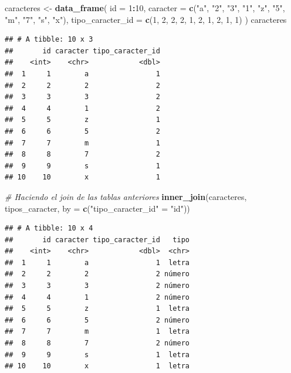 \documentclass[]{book}
\newenvironment{Shaded}{\begin{snugshade}}{\end{snugshade}}
\newcommand{\KeywordTok}[1]{\textcolor[rgb]{0.13,0.29,0.53}{\textbf{#1}}}
\newcommand{\DataTypeTok}[1]{\textcolor[rgb]{0.13,0.29,0.53}{#1}}
\newcommand{\DecValTok}[1]{\textcolor[rgb]{0.00,0.00,0.81}{#1}}
\newcommand{\StringTok}[1]{\textcolor[rgb]{0.31,0.60,0.02}{#1}}
\newcommand{\CommentTok}[1]{\textcolor[rgb]{0.56,0.35,0.01}{\textit{#1}}}
\newcommand{\OperatorTok}[1]{\textcolor[rgb]{0.81,0.36,0.00}{\textbf{#1}}}
\newcommand{\NormalTok}[1]{#1}
\theoremstyle{definition}
\theoremstyle{definition}
\theoremstyle{definition}
\theoremstyle{remark}
\begin{document}
\begin{Shaded}
\begin{Highlighting}[]
\NormalTok{caracteres <-}\StringTok{ }\KeywordTok{data_frame}\NormalTok{(}
  \DataTypeTok{id =} \DecValTok{1}\OperatorTok{:}\DecValTok{10}\NormalTok{,}
  \DataTypeTok{caracter =} \KeywordTok{c}\NormalTok{(}\StringTok{"a"}\NormalTok{, }\StringTok{"2"}\NormalTok{, }\StringTok{"3"}\NormalTok{, }\StringTok{"1"}\NormalTok{, }\StringTok{"z"}\NormalTok{, }\StringTok{"5"}\NormalTok{, }\StringTok{"m"}\NormalTok{, }\StringTok{"7"}\NormalTok{, }\StringTok{"s"}\NormalTok{, }\StringTok{"x"}\NormalTok{),}
  \DataTypeTok{tipo_caracter_id =} \KeywordTok{c}\NormalTok{(}\DecValTok{1}\NormalTok{, }\DecValTok{2}\NormalTok{, }\DecValTok{2}\NormalTok{, }\DecValTok{2}\NormalTok{, }\DecValTok{1}\NormalTok{, }\DecValTok{2}\NormalTok{, }\DecValTok{1}\NormalTok{, }\DecValTok{2}\NormalTok{, }\DecValTok{1}\NormalTok{, }\DecValTok{1}\NormalTok{)}
\NormalTok{)}
\NormalTok{caracteres}
\end{Highlighting}
\end{Shaded}

\begin{verbatim}
## # A tibble: 10 x 3
##       id caracter tipo_caracter_id
##    <int>    <chr>            <dbl>
##  1     1        a                1
##  2     2        2                2
##  3     3        3                2
##  4     4        1                2
##  5     5        z                1
##  6     6        5                2
##  7     7        m                1
##  8     8        7                2
##  9     9        s                1
## 10    10        x                1
\end{verbatim}

\begin{Shaded}
\begin{Highlighting}[]
\CommentTok{# Haciendo el join de las tablas anteriores}
\KeywordTok{inner_join}\NormalTok{(caracteres, tipos_caracter, }\DataTypeTok{by =} \KeywordTok{c}\NormalTok{(}\StringTok{"tipo_caracter_id"}\NormalTok{ =}\StringTok{ "id"}\NormalTok{))}
\end{Highlighting}
\end{Shaded}

\begin{verbatim}
## # A tibble: 10 x 4
##       id caracter tipo_caracter_id   tipo
##    <int>    <chr>            <dbl>  <chr>
##  1     1        a                1  letra
##  2     2        2                2 número
##  3     3        3                2 número
##  4     4        1                2 número
##  5     5        z                1  letra
##  6     6        5                2 número
##  7     7        m                1  letra
##  8     8        7                2 número
##  9     9        s                1  letra
## 10    10        x                1  letra
\end{verbatim}
\end{document}
